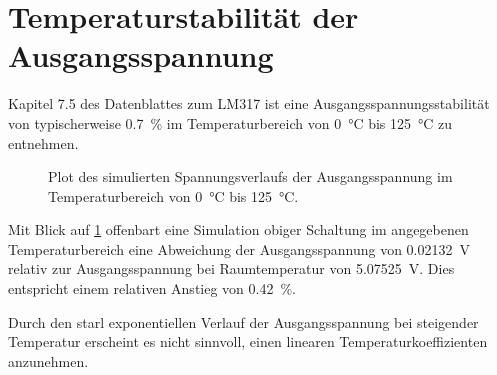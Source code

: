 	\section{Temperaturstabilität der Ausgangsspannung}
		Kapitel 7.5 des Datenblattes zum LM317 ist eine Ausgangsspannungsstabilität von typischerweise \SI{0,7}{\percent} im Temperaturbereich
		von \SI{0}{\celsius} bis \SI{125}{\celsius} zu entnehmen.
		\begin{figure}[h]
			\centering
			
			\caption[Verlauf der Ausgangsspannung im Temperaturbereich \SI{0}{\celsius} bis \SI{125}{\celsius}]{Plot des simulierten Spannungsverlaufs der Ausgangsspannung im Temperaturbereich von \SI{0}{\celsius} bis \SI{125}{\celsius}.}
			\label{fig:temp stab}
		\end{figure}
		Mit Blick auf \cref{fig:temp stab} offenbart eine Simulation obiger Schaltung
		im angegebenen Temperaturbereich eine Abweichung der Ausgangsspannung von \SI{+0,02132}{V} relativ zur Ausgangsspannung bei Raumtemperatur von
		\SI{5,07525}{V}. Dies entspricht einem relativen Anstieg von \SI{0,42}{\percent}.\par
		Durch den starl exponentiellen Verlauf der Ausgangsspannung bei steigender Temperatur erscheint es nicht sinnvoll, einen
		linearen Temperaturkoeffizienten anzunehmen.
